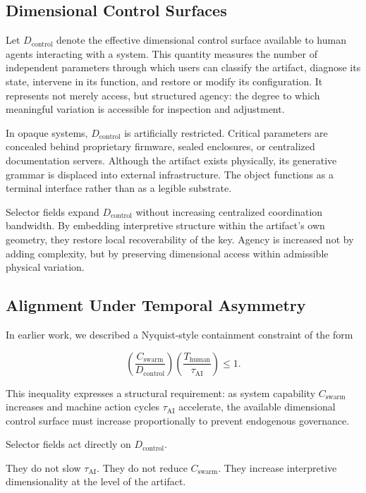 \documentclass[11pt]{article}
\begin{document}
\subsection{Dimensional Control Surfaces}

Let $D_{\text{control}}$ denote the effective dimensional control surface
available to human agents interacting with a system. This quantity
measures the number of independent parameters through which users can
classify the artifact, diagnose its state, intervene in its function,
and restore or modify its configuration. It represents not merely
access, but structured agency: the degree to which meaningful variation
is accessible for inspection and adjustment.

In opaque systems, $D_{\text{control}}$ is artificially restricted.
Critical parameters are concealed behind proprietary firmware, sealed
enclosures, or centralized documentation servers. Although the artifact
exists physically, its generative grammar is displaced into external
infrastructure. The object functions as a terminal interface rather than
as a legible substrate.

Selector fields expand $D_{\text{control}}$ without increasing
centralized coordination bandwidth. By embedding interpretive structure
within the artifact's own geometry, they restore local recoverability of
the key. Agency is increased not by adding complexity, but by preserving
dimensional access within admissible physical variation.

\subsection{Alignment Under Temporal Asymmetry}

In earlier work, we described a Nyquist-style containment constraint of the form

\[
\left( \frac{C_{\text{swarm}}}{D_{\text{control}}} \right)
\left( \frac{T_{\text{human}}}{\tau_{\text{AI}}} \right) \leq 1.
\]

This inequality expresses a structural requirement: as system capability 
$C_{\text{swarm}}$ increases and machine action cycles $\tau_{\text{AI}}$ 
accelerate, the available dimensional control surface must increase 
proportionally to prevent endogenous governance.

Selector fields act directly on $D_{\text{control}}$.

They do not slow $\tau_{\text{AI}}$.
They do not reduce $C_{\text{swarm}}$.
They increase interpretive dimensionality at the level of the artifact.
\end{document}
